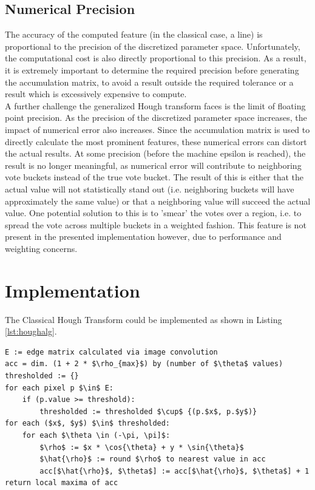 \documentclass[letterpaper,12pt]{article}
\begin{document}
\subsection{Numerical Precision}
The accuracy of the computed feature (in the classical case, a line) is proportional to the
precision of the discretized parameter space. Unfortunately, the computational cost is also
directly proportional to this precision. As a result, it is extremely important to determine
the required precision before generating the accumulation matrix, to avoid a result outside
the required tolerance or a result which is excessively expensive to compute.
\\
A further challenge the generalized Hough transform faces is the limit of floating point
precision. As the precision of the discretized parameter space increases, the impact of
numerical error also increases. Since the accumulation matrix is used to directly calculate
the most prominent features, these numerical errors can distort the actual results. At some
precision (before the machine epsilon is reached), the result is no longer meaningful, as
numerical error will contribute to neighboring vote buckets instead of the true vote bucket.
The result of this is either that the actual value will not statistically stand out
(i.e. neighboring buckets will have approximately the same value) or that a neighboring value
will succeed the actual value. One potential solution to this is to 'smear' the votes over a
region, i.e. to spread the vote across multiple buckets in a weighted fashion. This feature
is not present in the presented implementation however, due to performance and weighting concerns.

\section{Implementation}
The Classical Hough Transform could be implemented as shown in Listing \ref{lst:houghalg}.

\begin{lstlisting}[frame=tb,mathescape,caption={Hough transform algorithm},label={lst:houghalg}]
E := edge matrix calculated via image convolution
acc = dim. (1 + 2 * $\rho_{max}$) by (number of $\theta$ values)
thresholded := {}
for each pixel p $\in$ E:
    if (p.value >= threshold):
        thresholded := thresholded $\cup$ {(p.$x$, p.$y$)}
for each ($x$, $y$) $\in$ thresholded:
    for each $\theta \in (-\pi, \pi]$:
        $\rho$ := $x * \cos{\theta} + y * \sin{\theta}$
        $\hat{\rho}$ := round $\rho$ to nearest value in acc
        acc[$\hat{\rho}$, $\theta$] := acc[$\hat{\rho}$, $\theta$] + 1
return local maxima of acc
\end{lstlisting}
\end{document}

